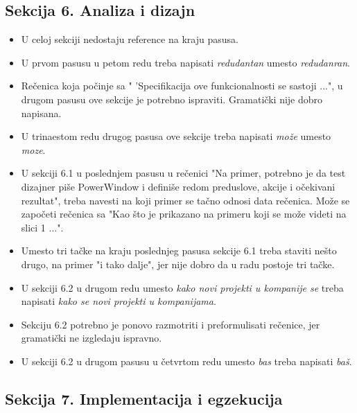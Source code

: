 \documentclass[a4paper]{report}
\begin{document}
\subsection{Sekcija 6. Analiza i dizajn}
\begin{itemize}
\item U celoj sekciji nedostaju reference na kraju pasusa.

\item  U prvom pasusu u petom redu treba napisati \textit{redudantan} umesto \textit{redudanran}.

\item Rečenica koja počinje sa " 'Specifikacija ove funkcionalnosti se sastoji ...", u drugom pasusu ove sekcije je potrebno ispraviti. Gramatički nije dobro napisana.

\item U trinaestom redu drugog pasusa ove sekcije treba napisati \textit{može} umesto \textit{moze}.

\item  U sekciji 6.1 u poslednjem pasusu u rečenici "Na primer, potrebno je da test dizajner piše PowerWindow i definiše redom preduslove, akcije i očekivani rezultat", treba navesti na koji primer se tačno odnosi data rečenica. Može se započeti rečenica sa "Kao što je prikazano na primeru koji se može videti na slici 1 ...".

\item Umesto tri tačke na kraju poslednjeg pasusa sekcije 6.1 treba staviti nešto drugo, na primer "i tako dalje", jer nije dobro da u radu postoje tri tačke.

\item U sekciji 6.2 u drugom redu umesto \textit{kako novi projekti u kompanije se} treba napisati \textit{kako se novi projekti u kompanijama}.

\item Sekciju 6.2 potrebno je ponovo razmotriti i preformulisati rečenice, jer gramatički ne izgledaju ispravno.

\item U sekciji 6.2 u drugom pasusu u četvrtom redu umesto \textit{bas} treba napisati \textit{baš}.

\end{itemize}

\subsection{Sekcija 7. Implementacija i egzekucija}
\end{document}
